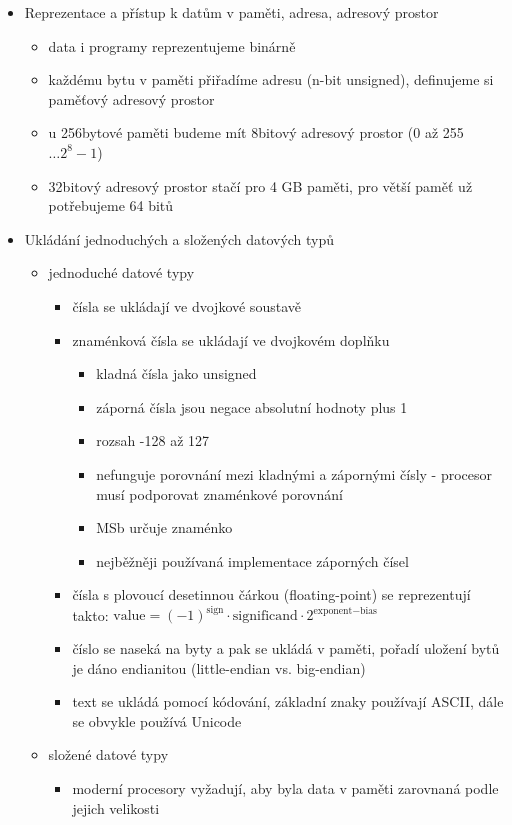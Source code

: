 \begin{itemize}
\begin{itemize}
\end{itemize}
\item Reprezentace a přístup k datům v paměti, adresa, adresový prostor
\begin{itemize}
\item data i programy reprezentujeme binárně
\item každému bytu v paměti přiřadíme adresu (n-bit unsigned), definujeme si paměťový adresový prostor
\item u 256bytové paměti budeme mít 8bitový adresový prostor (0 až 255 $\dots 2^8-1$)
\item 32bitový adresový prostor stačí pro 4 GB paměti, pro větší paměť už potřebujeme 64 bitů
\end{itemize}
\item Ukládání jednoduchých a složených datových typů
\begin{itemize}
\item jednoduché datové typy
\begin{itemize}
\item čísla se ukládají ve dvojkové soustavě
\item znaménková čísla se ukládají ve dvojkovém doplňku
\begin{itemize}
\item kladná čísla jako unsigned
\item záporná čísla jsou negace absolutní hodnoty plus 1
\item rozsah -128 až 127
\item nefunguje porovnání mezi kladnými a zápornými čísly - procesor musí podporovat znaménkové porovnání
\item MSb určuje znaménko
\item nejběžněji používaná implementace záporných čísel
\end{itemize}
\item čísla s plovoucí desetinnou čárkou (floating-point) se reprezentují takto: $\text{value}=(-1)^{\text{sign}}\cdot\text{significand}\cdot 2^{\text{exponent}-\text{bias}}$
\item číslo se naseká na byty a pak se ukládá v paměti, pořadí uložení bytů je dáno endianitou (little-endian vs. big-endian)
\item text se ukládá pomocí kódování, základní znaky používají ASCII, dále se obvykle používá Unicode
\end{itemize}
\item složené datové typy
\begin{itemize}
\item moderní procesory vyžadují, aby byla data v paměti zarovnaná podle jejich velikosti

\end{itemize}
\end{itemize}
\end{itemize}
